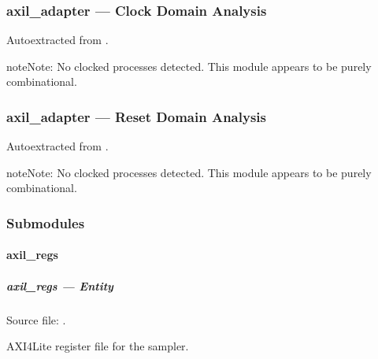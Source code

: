 \documentclass[letterpaper,10pt,english]{sphinxmanual}
\begin{document}
\sphinxstepscope


\subsubsection{axil\_adapter — Clock Domain Analysis}
\label{\detokenize{modules/axil_adapter/cdc:axil-adapter-clock-domain-analysis}}\label{\detokenize{modules/axil_adapter/cdc::doc}}
\sphinxAtStartPar
Auto\sphinxhyphen{}extracted from .

\begin{sphinxadmonition}{note}{Note:}
\sphinxAtStartPar
No clocked processes detected. This module appears to be purely combinational.
\end{sphinxadmonition}

\sphinxstepscope


\subsubsection{axil\_adapter — Reset Domain Analysis}
\label{\detokenize{modules/axil_adapter/reset:axil-adapter-reset-domain-analysis}}\label{\detokenize{modules/axil_adapter/reset::doc}}
\sphinxAtStartPar
Auto\sphinxhyphen{}extracted from .

\begin{sphinxadmonition}{note}{Note:}
\sphinxAtStartPar
No clocked processes detected. This module appears to be purely combinational.
\end{sphinxadmonition}


\subsubsection{Submodules}
\label{\detokenize{modules/axil_adapter/index:submodules}}
\sphinxstepscope


\paragraph{axil\_regs}
\label{\detokenize{modules/axil_regs/index:axil-regs}}\label{\detokenize{modules/axil_regs/index::doc}}
\sphinxstepscope


\subparagraph{axil\_regs — Entity}
\label{\detokenize{modules/axil_regs/entity:axil-regs-entity}}\label{\detokenize{modules/axil_regs/entity::doc}}
\sphinxAtStartPar
Source file: .

\sphinxAtStartPar
AXI4\sphinxhyphen{}Lite register file for the sampler.
\end{document}
